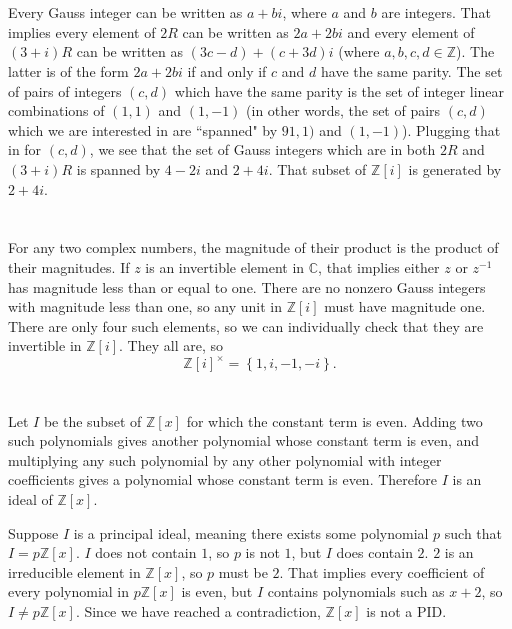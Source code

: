 \documentclass[12pt]{article}
\begin{document}
\section{}
\noindent{}\bigskip\par
Every Gauss integer can be written as $a+bi$, where $a$ and $b$ are integers. That implies every element of $2R$ can be written as $2a+2bi$ and every element of $(3+i)R$ can be written as $(3c-d)+(c+3d)i$ (where $a,b,c,d \in \mathbb{Z}$). The latter is of the form $2a+2bi$ if and only if $c$ and $d$ have the same parity. The set of pairs of integers $(c,d)$ which have the same parity is the set of integer linear combinations of $(1,1)$ and $(1,-1)$ (in other words, the set of pairs $(c,d)$ which we are interested in are ``spanned" by $91,1)$ and $(1,-1)$). Plugging that in for $(c,d)$, we see that the set of Gauss integers which are in both $2R$ and $(3+i)R$ is spanned by $4-2i$ and $2+4i$. That subset of $\mathbb{Z}[i]$ is generated by $2+4i$.

\section{}
\noindent{}\bigskip\par
For any two complex numbers, the magnitude of their product is the product of their magnitudes. If $z$ is an invertible element in $\mathbb{C}$, that implies either $z$ or $z^{-1}$ has magnitude less than or equal to one. There are no nonzero Gauss integers with magnitude less than one, so any unit in $\mathbb{Z}[i]$ must have magnitude one. There are only four such elements, so we can individually check that they are invertible in $\mathbb{Z}[i]$. They all are, so
\[ \mathbb{Z}[i]^\times = \left\{ 1, i, -1, -i \right\}. \]

\section{}
\noindent{}\bigskip\par
Let $I$ be the subset of $\mathbb{Z}[x]$ for which the constant term is even. Adding two such polynomials gives another polynomial whose constant term is even, and multiplying any such polynomial by any other polynomial with integer coefficients gives a polynomial whose constant term is even. Therefore $I$ is an ideal of $\mathbb{Z}[x]$.
\par
Suppose $I$ is a principal ideal, meaning there exists some polynomial $p$ such that $I=p\mathbb{Z}[x]$. $I$ does not contain $1$, so $p$ is not $1$, but $I$ does contain $2$. $2$ is an irreducible element in $\mathbb{Z}[x]$, so $p$ must be $2$. That implies every coefficient of every polynomial in $p\mathbb{Z}[x]$ is even, but $I$ contains polynomials such as $x+2$, so $I \neq p\mathbb{Z}[x]$. Since we have reached a contradiction, $\mathbb{Z}[x]$ is not a PID.
\end{document}
